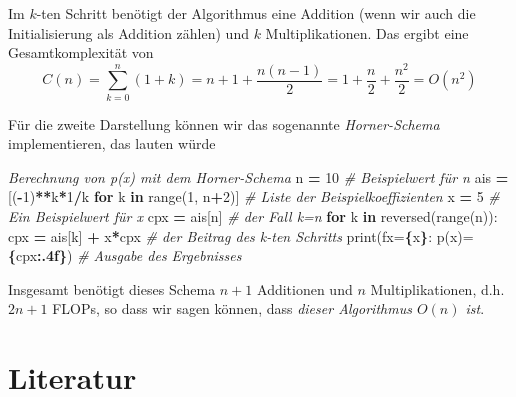 \documentclass[
]{book}
\newenvironment{Shaded}{\begin{snugshade}}{\end{snugshade}}
\newcommand{\BuiltInTok}[1]{#1}
\newcommand{\CommentTok}[1]{\textcolor[rgb]{0.56,0.35,0.01}{\textit{#1}}}
\newcommand{\ControlFlowTok}[1]{\textcolor[rgb]{0.13,0.29,0.53}{\textbf{#1}}}
\newcommand{\DecValTok}[1]{\textcolor[rgb]{0.00,0.00,0.81}{#1}}
\newcommand{\KeywordTok}[1]{\textcolor[rgb]{0.13,0.29,0.53}{\textbf{#1}}}
\newcommand{\NormalTok}[1]{#1}
\newcommand{\OperatorTok}[1]{\textcolor[rgb]{0.81,0.36,0.00}{\textbf{#1}}}
\newcommand{\SpecialCharTok}[1]{\textcolor[rgb]{0.81,0.36,0.00}{\textbf{#1}}}
\newcommand{\SpecialStringTok}[1]{\textcolor[rgb]{0.31,0.60,0.02}{#1}}
\theoremstyle{definition}
\theoremstyle{definition}
\theoremstyle{definition}
\theoremstyle{definition}
\theoremstyle{remark}
\begin{document}
Im \(k\)-ten Schritt benötigt der Algorithmus eine Addition (wenn wir auch die Initialisierung als Addition zählen) und \(k\) Multiplikationen. Das ergibt eine Gesamtkomplexität von
\begin{equation*}
C(n) = \sum_{k=0}^n(1+k) = n+1 + \frac{n(n-1)}{2} = 1 + \frac n2 + \frac{n^2}2 = O(n^2)
\end{equation*}

Für die zweite Darstellung können wir das sogenannte \emph{Horner-Schema} implementieren, das lauten würde

\begin{Shaded}
\begin{Highlighting}[]
\CommentTok{\textquotesingle{}\textquotesingle{}\textquotesingle{}Berechnung von p(x) mit dem Horner{-}Schema}
\CommentTok{\textquotesingle{}\textquotesingle{}\textquotesingle{}}
\NormalTok{n }\OperatorTok{=} \DecValTok{10}                                      \CommentTok{\# Beispielwert für n}
\NormalTok{ais }\OperatorTok{=}\NormalTok{ [(}\OperatorTok{{-}}\DecValTok{1}\NormalTok{)}\OperatorTok{**}\NormalTok{k}\OperatorTok{*}\DecValTok{1}\OperatorTok{/}\NormalTok{k }\ControlFlowTok{for}\NormalTok{ k }\KeywordTok{in} \BuiltInTok{range}\NormalTok{(}\DecValTok{1}\NormalTok{, n}\OperatorTok{+}\DecValTok{2}\NormalTok{)]  }\CommentTok{\# Liste der Beispielkoeffizienten}
\NormalTok{x }\OperatorTok{=} \DecValTok{5}                                       \CommentTok{\# Ein Beispielwert für x}
\NormalTok{cpx }\OperatorTok{=}\NormalTok{ ais[n]                                }\CommentTok{\# der Fall k=n}
\ControlFlowTok{for}\NormalTok{ k }\KeywordTok{in} \BuiltInTok{reversed}\NormalTok{(}\BuiltInTok{range}\NormalTok{(n)):                }
\NormalTok{    cpx }\OperatorTok{=}\NormalTok{ ais[k] }\OperatorTok{+}\NormalTok{ x}\OperatorTok{*}\NormalTok{cpx                    }\CommentTok{\# der Beitrag des k{-}ten Schritts}
\BuiltInTok{print}\NormalTok{(}\SpecialStringTok{f\textquotesingle{}x=}\SpecialCharTok{\{}\NormalTok{x}\SpecialCharTok{\}}\SpecialStringTok{: p(x)=}\SpecialCharTok{\{}\NormalTok{cpx}\SpecialCharTok{:.4f\}}\SpecialStringTok{\textquotesingle{}}\NormalTok{)             }\CommentTok{\# Ausgabe des Ergebnisses}
\end{Highlighting}
\end{Shaded}

Insgesamt benötigt dieses Schema \(n+1\) Additionen und \(n\) Multiplikationen, d.h. \(2n+1\) FLOPs, so dass wir sagen können, dass \emph{dieser Algorithmus \(O(n)\) ist}.

\hypertarget{literatur}{%
\section{Literatur}\label{literatur}}
\end{document}
